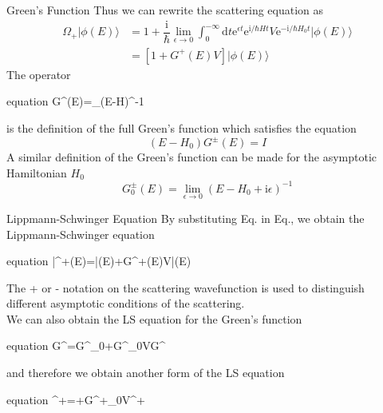 \documentclass{beamer}
\begin{document}
	\begin{frame}{Green's Function}
		Thus we can rewrite the scattering equation as 
		\begin{align}
			\Omega_+|\phi(E)\rangle&=1+\dfrac{\mathrm{i}}{\hbar}\lim\limits_{\epsilon\rightarrow0}\int_0^{-\infty}\mathrm{d}t\mathrm{e}^{\epsilon t}\mathrm{e}^{\mathrm{i}/\hbar Ht}V\mathrm{e}^{-\mathrm{i}/\hbar H_0t}|\phi(E)\rangle\nonumber\\
			&=[1+G^+(E)V]|\phi(E)\rangle
			\label{47}
		\end{align}
		The operator
		\begin{empheq}[box=\fbox]{equation}
			G^\pm(E)=\lim\limits_{\epsilon{}}(E-H\pm{}\epsilon)^{-1}
		\end{empheq}
		is the definition of the full Green's function which satisfies the equation
		\begin{equation}
			(E-H_0)G^\pm(E)=I
		\end{equation}
		A similar definition of the Green's function can be made for the asymptotic Hamiltonian $H_0$
		\begin{equation}
			G^\pm_0(E)=\lim\limits_{\epsilon\rightarrow 0}(E-H_0+\mathrm{i}\epsilon)^{-1}
		\end{equation}
	\end{frame}
	\begin{frame}{Lippmann-Schwinger Equation}
		By substituting Eq. in Eq., we obtain the Lippmann-Schwinger equation
		\begin{empheq}[box=\fbox]{equation}
			|\psi^+(E)\rangle=|\phi(E)\rangle+G^+(E)V|\phi(E)\rangle
		\end{empheq}
		The + or - notation on the scattering wavefunction is used to distinguish different asymptotic conditions of the scattering.\\
		We can also obtain the LS equation for the Green's function
		\begin{empheq}[box=\fbox]{equation}
			G^\pm=G^\pm_0+G^\pm_0VG^\pm
		\end{empheq}
		and therefore we obtain another form of the LS equation
		\begin{empheq}[box=\fbox]{equation}
			\psi^+=\phi+G^+_0V\psi^+
		\end{empheq}
	\end{frame}
\end{document}
